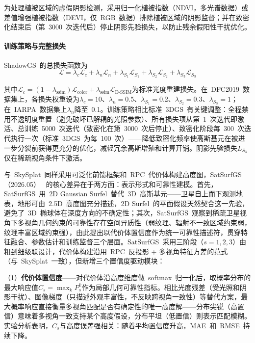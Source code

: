为处理植被区域的虚假阴影检测，采用归一化植被指数（NDVI，多光谱数据）或差值增强植被指数（DEVI，仅~RGB~数据）排除植被区域的阴影监督；并在致密化结束后（第~3000~次迭代后）停止阴影先验损失，以防止残余假阳性干扰优化。

\paragraph{训练策略与完整损失} ShadowGS~的总损失函数为
\begin{equation}
\mathcal{L} = \lambda_c \mathcal{L}_c + \lambda_n \mathcal{L}_n + \lambda_{S_1} \mathcal{L}_{S_1} + \lambda_{S_2} \mathcal{L}_{S_2} + \lambda_{S_3} \mathcal{L}_{S_3}
\end{equation}

其中$\mathcal{L}_c = (1-\lambda_{\text{ssim}})\mathcal{L}_{\text{color}} + \lambda_{\text{ssim}}\mathcal{L}_{\text{D-SSIM}}$为标准光度重建损失。在~DFC2019~数据集上，各损失权重设为$\lambda_c = 10$、$\lambda_n = 0.5$、$\lambda_{S_1} = 0.2$、$\lambda_{S_2} = 0.3$、$\lambda_{S_3} = 1$；在~IARPA~数据集上$\lambda_n$降至~0.1。训练策略相比标准~3DGS~有关键调整：全程禁用不透明度重置（避免破坏已解耦的光照参数）、所有损失项从第~1~次迭代即激活、总训练~5000~次迭代（致密化在第~3000~次后停止）、致密化阶段每~300~次迭代执行一次（标准~3DGS~为每~100~次）——降低致密化频率使高斯基元在被进一步分裂前获得更充分的优化，减轻冗余高斯增殖和计算开销。阴影先验损失$L_{S_3}$仅在稀疏视角条件下激活。

与~SkySplat~同样采用可泛化前馈框架和~RPC~代价体构建高度图，SatSurfGS（2026.05）~\cite{2605_07181} 的核心差异在于两方面：表示形式和可靠性建模。首先，SatSurfGS~用~2D Gaussian Surfel~替代~3D~高斯基元——卫星自上而下观测地表，地形可由~2.5D~高度图充分描述，2D Surfel~的平面假设天然契合这一先验，避免了~3D~椭球体在深度方向的不确定性；其次，SatSurfGS~观察到稀疏卫星视角下多视角几何约束的可靠性存在空间异质性（弱纹理、辐射不一致区域约束弱，纹理丰富区域约束强），由此提出以代价体置信度作为统一可靠性描述符，贯穿特征融合、参数估计和训练监督三个层面。SatSurfGS~采用三阶段（$s=1,2,3$）由粗到细级联设计，代价体构建沿用~RPC~反投影 + 多视角特征方差的范式（与~SkySplat~一致），但新增三个置信度驱动模块：

（1）\textbf{代价体置信度}——对代价体沿高度维度做~softmax~归一化后，取概率分布的最大响应值$C_s = \max_k P_s^k$作为局部几何可靠性指标。相比光度残差（受光照和阴影干扰）、图像梯度（只描述外观丰富性，不反映跨视角一致性）等替代方案，最大概率响应直接衡量多视角匹配是否有确定性的唯一高度解——分布尖锐（高置信）意味着多视角一致支持某个高度假设，分布平坦（低置信）则表示匹配模糊。实验分析表明，$C_s$与高度误差强相关：随着平均置信度升高，MAE~和~RMSE~持续下降。

